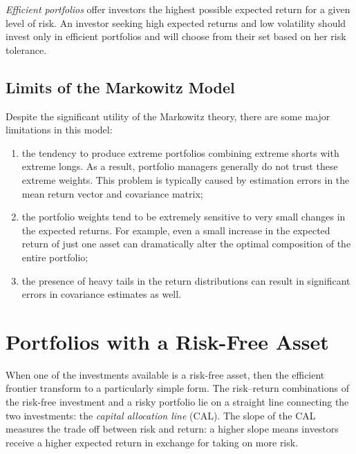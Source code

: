 \emph{Efficient portfolios} offer investors the highest possible expected return for a given level of risk.
An investor seeking high expected returns and low volatility should invest only in efficient portfolios and will choose from their set based on her risk tolerance.

\subsection{Limits of the Markowitz Model}
\label{sec:limits-of-the-markowitz-model}

Despite the significant utility of the Markowitz theory, there are some major limitations in this model:

\begin{enumerate}
\tightlist
\item the tendency to produce extreme portfolios combining extreme shorts with extreme longs. As a result, portfolio managers generally do not trust these extreme weights. This problem is typically caused by
estimation errors in the mean return vector and covariance matrix;
\item the portfolio weights tend to be extremely sensitive to very small changes in the expected returns. For example, even a small increase in the expected return of just one asset can dramatically alter the optimal composition of the entire portfolio;
\item the presence of heavy tails in the return distributions can result in significant errors in covariance estimates as well.
\end{enumerate}


\section{Portfolios with a Risk-Free Asset}
\label{portfolios-with-a-risk-free-asset}

When one of the investments available is a risk-free asset, then the efficient frontier transform to a particularly simple form. The risk–return combinations of the risk-free investment and a risky portfolio lie on a straight line connecting the two investments: the \emph{capital allocation line} (CAL). The slope of the CAL measures the trade off between risk and return: a higher slope means investors receive a higher expected return in exchange for taking on more risk.

